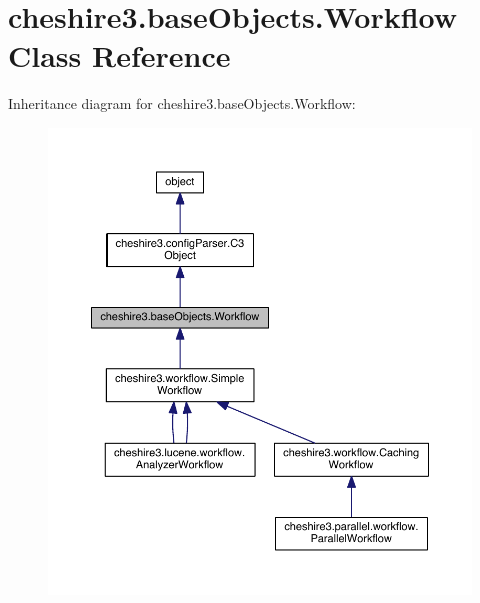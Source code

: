 \hypertarget{classcheshire3_1_1base_objects_1_1_workflow}{\section{cheshire3.\-base\-Objects.\-Workflow Class Reference}
\label{classcheshire3_1_1base_objects_1_1_workflow}
}


Inheritance diagram for cheshire3.\-base\-Objects.\-Workflow\-:
\nopagebreak
\begin{figure}[H]
\begin{center}
\leavevmode
\includegraphics[width=350pt]{classcheshire3_1_1base_objects_1_1_workflow__inherit__graph}
\end{center}
\end{figure}


